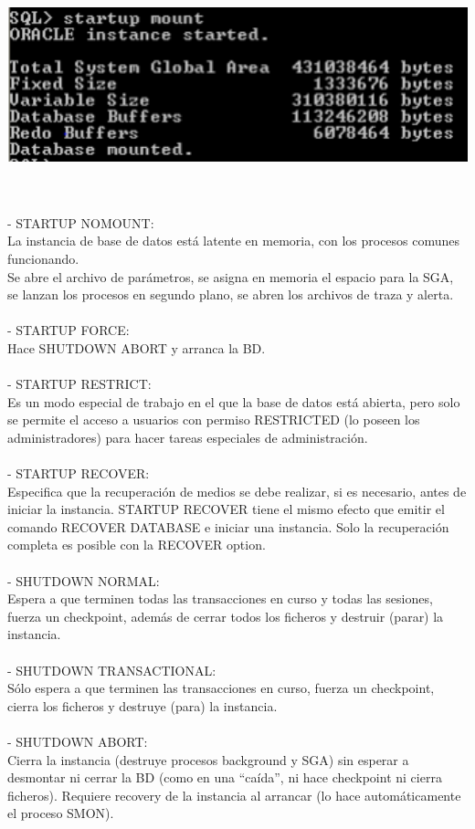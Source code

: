 \begin{itemize}
	\begin{center}
	\includegraphics[width=14cm]{./Imagenes/imagen62} 
	\end{center}
  \\
    \\- STARTUP NOMOUNT:
    \\La instancia de base de datos está latente en memoria, con los procesos comunes funcionando. 
    \\Se abre el archivo de parámetros, se asigna en memoria el espacio para la SGA, 
    se lanzan los procesos en segundo plano, se abren los archivos de traza y alerta.
    \\
    \\- STARTUP FORCE:
    \\Hace SHUTDOWN ABORT y arranca la BD.
    \\
    \\- STARTUP RESTRICT:
    \\Es un modo especial de trabajo en el que la base de datos está abierta, pero solo se permite el acceso a usuarios 
    con permiso RESTRICTED (lo poseen los administradores) para hacer tareas especiales de administración.
    \\
    \\- STARTUP RECOVER:
    \\Especifica que la recuperación de medios se debe realizar, si es necesario, antes de iniciar la instancia. STARTUP RECOVER tiene el mismo efecto que emitir el comando RECOVER DATABASE e iniciar una instancia. Solo la recuperación completa es posible con la RECOVER option.
    \\
    \\- SHUTDOWN NORMAL:
    \\Espera a que terminen todas las transacciones en curso y todas las sesiones, 
    fuerza un checkpoint, además de cerrar todos los ficheros y destruir (parar) la instancia.
    \\
    \\- SHUTDOWN TRANSACTIONAL:
    \\Sólo espera a que terminen las transacciones en curso, fuerza un checkpoint, cierra los ficheros y destruye (para) la instancia.
    \\
    \\- SHUTDOWN ABORT:
     \\Cierra la instancia (destruye procesos background y SGA) sin esperar a desmontar ni cerrar la BD (como en una “caída”, ni hace checkpoint ni cierra ficheros). Requiere recovery de la instancia al arrancar (lo hace automáticamente el proceso SMON).


\end{itemize}
